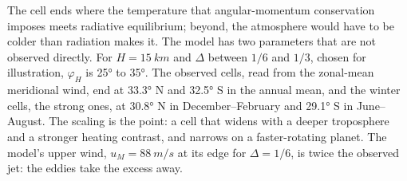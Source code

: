 The cell ends where the temperature that angular-momentum conservation
imposes meets radiative equilibrium; beyond, the atmosphere would have to
be colder than radiation makes it. The model has two parameters that are
not observed directly. For $H = \qty{15}{km}$ and $\Delta$ between $1/6$ and
$1/3$, chosen for illustration, $\varphi_H$ is \ang{25} to \ang{35}. The
observed cells, read from the zonal-mean meridional wind, end at
\ang{33.3} N and \ang{32.5} S in the annual mean, and the winter cells,
the strong ones, at \ang{30.8} N in December--February and \ang{29.1} S in
June--August. The scaling is the point: a cell that widens with a
deeper troposphere and a stronger heating contrast, and narrows on a
faster-rotating planet. The model's upper wind, $u_M =
\qty{88}{m/s}$ at its edge for $\Delta = 1/6$, is twice the observed jet:
the eddies take the excess away.

